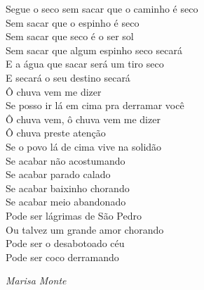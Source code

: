 \documentclass[./main.tex]{subfiles}
\begin{document}
\epigraph{
Segue o seco sem sacar que o caminho é seco \\
Sem sacar que o espinho é seco\\
Sem sacar que seco é o ser sol\\
Sem sacar que algum espinho seco secará\\
E a água que sacar será um tiro seco\\
E secará o seu destino secará\\
Ô chuva vem me dizer\\
Se posso ir lá em cima pra derramar você\\
Ô chuva vem, ô chuva vem me dizer\\
Ô chuva preste atenção\\
Se o povo lá de cima vive na solidão\\
Se acabar não acostumando\\
Se acabar parado calado\\
Se acabar baixinho chorando\\
Se acabar meio abandonado\\
Pode ser lágrimas de São Pedro\\
Ou talvez um grande amor chorando\\
Pode ser o desabotoado céu\\
Pode ser coco derramando
}{\textit{Marisa Monte}}
\clearpage
\end{document}
